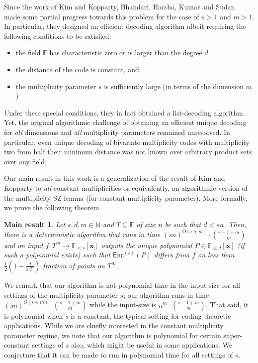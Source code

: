 \documentclass{article}
\def\Natural{\mathbb{N}}
\def\Field{\mathbb{F}}
\let\N\Natural
\let\F\Field
\def\vecx{\mathbf{x}}
\newtheorem*{mainthm}{Main result}
\newcommand{\enc}{{\mathsf{Enc}}}
\newcommand{\vx}{\vecx}
\begin{document}
	Since the work of Kim and Kopparty, Bhandari, Harsha, Kumar and Sudan~\cite{BhandariHKS2021-mgrid} made some
	partial progress towards this problem for the case of $s>1$ and
	$m >1$. In particular, they designed an efficient decoding algorithm
	albeit requiring the following conditions to be satisfied: 
	\begin{itemize}
		\item  the field $\F$ has characteristic zero or is larger than the degree $d$
		\item the distance of the code is constant, and
		\item the multiplicity parameter $s$ is sufficiently large (in terms of the dimension $m$)
	\end{itemize}
	Under these special conditions, they in
	fact obtained a list-decoding algorithm. Yet, the original algorithmic
	challenge of obtaining an efficient unique decoding for \emph{all}
	dimensions and \emph{all} multiplicity parameters remained
	unresolved. In particular, even unique
	decoding of bivariate multiplicity codes with multiplicity two from
	half their minimum distance was not known over arbitrary product
	sets over any field.
	
	Our main result in this work is a generalization of the result of Kim
	and Kopparty  to \emph{all} constant multiplicities or equivalently, an algorithmic version of the multiplicity SZ lemma (for constant multiplicity parameter). More formally, we prove the following theorem. 
	
	\begin{mainthm}\label{thm: main intro}
		Let $s, d, m \in \N$ and $T \subseteq \F$ of size $n$ be such that $d <
		sn$. Then, there is a deterministic algorithm that runs in time
		$(sn)^{O(s+m)}\cdot  \binom{s - 1 + m}{m}$ and on
		input $f\colon T^m \to \mathbb{F}_{<s}[\vx]$ outputs the unique polynomial
		$P \in \mathbb{F}_{\leq d}[\vx]$ (if such  a polynomial exists) such that $\enc^{(s)}(P)$
		differs from $f$ on less than $\frac12\left(1-\frac{d}{s|T|}\right)$ fraction of points on $T^m$.   
	\end{mainthm}
	
	We remark that our algorithm is not polynomial-time in the input size for all settings of the multiplicity parameter $s$; our algorithm runs in time $(sn)^{O(s+m)}\cdot  \binom{s - 1 + m}{m}$ while the input-size is $n^{m}\cdot  \binom{s - 1 + m}{m}$. That said, it is polynomial when $s$ is a constant, the typical setting for coding-theoretic applications. While we are chiefly interested in the constant multiplicity parameter regime, we note that our algorithm is polynomial for certain super-constant settings of $s$ also, which might be useful in some applications. We conjecture that it can be made to run in polynomial time for all settings of $s$. 
	
\end{document}
